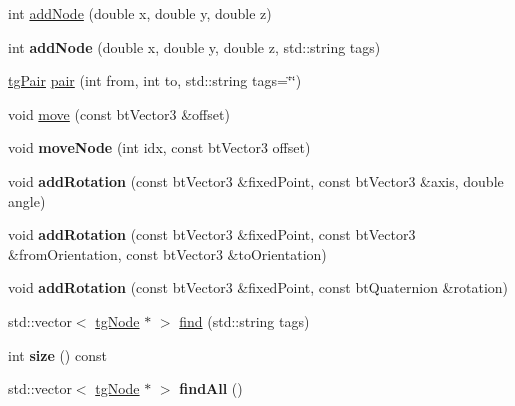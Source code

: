 \begin{DoxyCompactItemize}
\item 
int \hyperlink{classtg_nodes_a9f28fa971610f4ee16264de703a74386}{add\-Node} (double x, double y, double z)
\item 
\hypertarget{classtg_nodes_af0c02da32fc1488046bab9f84d514115}{int {\bfseries add\-Node} (double x, double y, double z, std\-::string tags)}\label{classtg_nodes_af0c02da32fc1488046bab9f84d514115}

\item 
\hyperlink{classtg_pair}{tg\-Pair} \hyperlink{classtg_nodes_a0e30fda4f24f869cbe07ec69bf14ebfc}{pair} (int from, int to, std\-::string tags=\char`\"{}\char`\"{})
\item 
void \hyperlink{classtg_nodes_a9375dc4de8bcf20b49efae0a26e4f3af}{move} (const bt\-Vector3 \&offset)
\item 
\hypertarget{classtg_nodes_aa26f85c365ea6bba955ec95304a79827}{void {\bfseries move\-Node} (int idx, const bt\-Vector3 offset)}\label{classtg_nodes_aa26f85c365ea6bba955ec95304a79827}

\item 
\hypertarget{classtg_nodes_a29b45b626c6a096781883c818c6b936c}{void {\bfseries add\-Rotation} (const bt\-Vector3 \&fixed\-Point, const bt\-Vector3 \&axis, double angle)}\label{classtg_nodes_a29b45b626c6a096781883c818c6b936c}

\item 
\hypertarget{classtg_nodes_a841bdb039b4003b16eb63cef843ea943}{void {\bfseries add\-Rotation} (const bt\-Vector3 \&fixed\-Point, const bt\-Vector3 \&from\-Orientation, const bt\-Vector3 \&to\-Orientation)}\label{classtg_nodes_a841bdb039b4003b16eb63cef843ea943}

\item 
\hypertarget{classtg_nodes_a22931e015e197a1a4845453c6b7b1453}{void {\bfseries add\-Rotation} (const bt\-Vector3 \&fixed\-Point, const bt\-Quaternion \&rotation)}\label{classtg_nodes_a22931e015e197a1a4845453c6b7b1453}

\item 
std\-::vector$<$ \hyperlink{classtg_node}{tg\-Node} $\ast$ $>$ \hyperlink{classtg_taggables_a233ca612e0279e5c1515bb8e13cc11f0}{find} (std\-::string tags)
\item 
\hypertarget{classtg_taggables_ae905e8ace08b8de004d1016e4ccb1ea0}{int {\bfseries size} () const}\label{classtg_taggables_ae905e8ace08b8de004d1016e4ccb1ea0}

\item 
\hypertarget{classtg_taggables_a3b72ad1ae319e1b4e9429765307962d4}{std\-::vector$<$ \hyperlink{classtg_node}{tg\-Node} $\ast$ $>$ {\bfseries find\-All} ()}\label{classtg_taggables_a3b72ad1ae319e1b4e9429765307962d4}


\end{DoxyCompactItemize}
